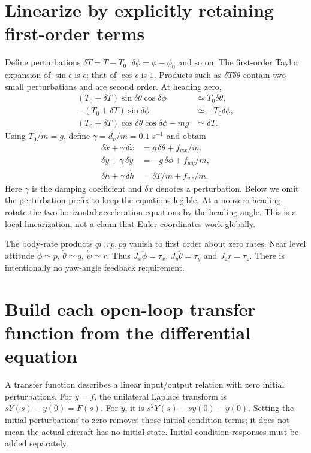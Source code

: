 \section{Linearize by explicitly retaining first-order terms}
Define perturbations $\delta T=T-T_0$, $\delta\phi=\phi-\phi_0$ and so on.
The first-order Taylor expansion of $\sin\epsilon$ is $\epsilon$; that of
$\cos\epsilon$ is $1$. Products such as $\delta T\delta\theta$ contain two
small perturbations and are second order. At heading zero,
\begin{align}
(T_0+\delta T)\sin\delta\theta\cos\delta\phi
 &\simeq T_0\delta\theta,\\
-(T_0+\delta T)\sin\delta\phi&\simeq-T_0\delta\phi,\\
(T_0+\delta T)\cos\delta\theta\cos\delta\phi-mg&\simeq\delta T.
\end{align}
Using $T_0/m=g$, define $\gamma=d_v/m=0.1$ s$^{-1}$ and obtain
\begin{align}
\delta\ddot x+\gamma\,\delta\dot x&=g\,\delta\theta+f_{wx}/m,\\
\delta\ddot y+\gamma\,\delta\dot y&=-g\,\delta\phi+f_{wy}/m,\\
\delta\ddot h+\gamma\,\delta\dot h&=\delta T/m+f_{wz}/m.
\end{align}
Here $\gamma$ is the damping coefficient and $\delta x$ denotes a perturbation.
Below we omit the perturbation prefix to keep the equations legible. At a nonzero heading, rotate the two
horizontal acceleration equations by the heading angle. This is a local
linearization, not a claim that Euler coordinates work globally.

The body-rate products $qr,rp,pq$ vanish to first order about zero rates.
Near level attitude $\dot\phi\simeq p$, $\dot\theta\simeq q$, $\dot\psi\simeq r$.
Thus $J_x\ddot\phi=\tau_x$, $J_y\ddot\theta=\tau_y$ and
$J_z\dot r=\tau_z$. There is intentionally no yaw-angle feedback requirement.

\section{Build each open-loop transfer function from the differential equation}
A transfer function describes a linear input/output relation with zero initial
perturbations. For $\dot y=f$, the unilateral Laplace transform is
$sY(s)-y(0)=F(s)$. For $\ddot y$, it is
$s^2Y(s)-sy(0)-\dot y(0)$. Setting the initial perturbations to zero removes
those initial-condition terms; it does not mean the actual aircraft has no
initial state. Initial-condition responses must be added separately.

